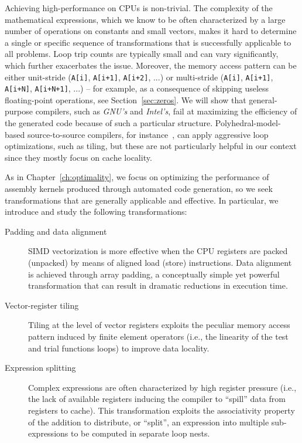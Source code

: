 Achieving high-performance on CPUs is non-trivial. The complexity of the mathematical expressions, which we know to be often characterized by a large number of operations on constants and small vectors, makes it hard to determine a single or specific sequence of transformations that is successfully applicable to all problems. Loop trip counts are typically small and can vary significantly, which further exacerbates the issue. Moreover, the memory access pattern can be either unit-stride (\texttt{A[i]}, \texttt{A[i+1]}, \texttt{A[i+2]}, ...) or multi-stride (\texttt{A[i]}, \texttt{A[i+1]}, \texttt{A[i+N]}, \texttt{A[i+N+1]}, ...) -- for example, as a consequence of skipping useless floating-point operations, see Section~\ref{sec:zeros}. We will show that general-purpose compilers, such as \emph{GNU's} and \emph{Intel's}, fail at maximizing the efficiency of the generated code because of such a particular structure. Polyhedral-model-based source-to-source compilers, for instance~\cite{pluto}, can apply aggressive loop optimizations, such as tiling, but these are not particularly helpful in our context since they mostly focus on cache locality. 

As in Chapter~\ref{ch:optimality}, we focus on optimizing the performance of assembly kernels produced through automated code generation, so we seek transformations that are generally applicable and effective. In particular, we introduce and study the following transformations:

\begin{description}
\item[Padding and data alignment] SIMD vectorization is more effective when the CPU registers are packed (unpacked) by means of aligned load (store) instructions. Data alignment is achieved through array padding, a conceptually simple yet powerful transformation that can result in dramatic reductions in execution time. 
\item[Vector-register tiling] Tiling at the level of vector registers exploits the peculiar memory access pattern induced by finite element operators (i.e., the linearity of the test and trial functions loops) to improve data locality.
\item[Expression splitting] Complex expressions are often characterized by high register pressure (i.e., the lack of available registers inducing the compiler to ``spill'' data from registers to cache). This transformation exploits the associativity property of the addition to distribute, or ``split'', an expression into multiple sub-expressions to be computed in separate loop nests.
\end{description}

